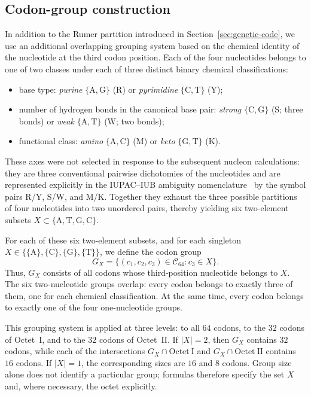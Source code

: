 \documentclass[11pt,a4paper]{article}
\renewcommand{\_}{\origunderscore\allowbreak}
\begin{document}
\subsection{Codon-group construction}
\label{sec:partitioning}

In addition to the Rumer partition introduced in
Section~\ref{sec:genetic-code}, we use an additional overlapping
grouping system based on the chemical identity of the nucleotide at
the third codon position. Each of the four nucleotides belongs to
one of two classes under each of three distinct binary chemical
classifications:
\begin{itemize}
  \item base type: \emph{purine}
        $\{\mathrm{A},\mathrm{G}\}$ (R) or \emph{pyrimidine}
        $\{\mathrm{C},\mathrm{T}\}$ (Y);
  \item number of hydrogen bonds in the canonical base pair:
        \emph{strong} $\{\mathrm{C},\mathrm{G}\}$ (S; three bonds)
        or \emph{weak} $\{\mathrm{A},\mathrm{T}\}$ (W; two bonds);
  \item functional class: \emph{amino}
        $\{\mathrm{A},\mathrm{C}\}$ (M) or \emph{keto}
        $\{\mathrm{G},\mathrm{T}\}$ (K).
\end{itemize}
These axes were not selected in response to the subsequent
nucleon calculations: they are three conventional pairwise
dichotomies of the nucleotides and are represented explicitly
in the IUPAC--IUB ambiguity nomenclature~\cite{cornishbowden1985} by the symbol pairs
R/Y, S/W, and M/K. Together they exhaust the three
possible partitions of four nucleotides into two unordered
pairs, thereby yielding six two-element subsets
$X \subset \{\mathrm{A}, \mathrm{T}, \mathrm{G}, \mathrm{C}\}$.

For each of these six two-element subsets, and for each singleton
$X\in\{\{\mathrm{A}\},\{\mathrm{C}\},\{\mathrm{G}\},
\{\mathrm{T}\}\}$, we define the codon group
\[
G_X =
\{(c_1,c_2,c_3)\in\mathcal{C}_{64}
  : c_3\in X\}.
\]
Thus, $G_X$ consists of all codons whose third-position nucleotide
belongs to $X$. The six two-nucleotide groups overlap: every codon
belongs to exactly three of them, one for each chemical
classification. At the same time, every codon belongs to exactly
one of the four one-nucleotide groups.

This grouping system is applied at three levels: to all $64$
codons, to the $32$ codons of Octet~I, and to the $32$ codons of
Octet~II. If $|X|=2$, then $G_X$ contains $32$ codons, while each
of the intersections $G_X\cap\mathrm{Octet~I}$ and
$G_X\cap\mathrm{Octet~II}$ contains $16$ codons. If $|X|=1$, the
corresponding sizes are $16$ and $8$ codons. Group size alone does
not identify a particular group; formulas therefore specify the
set $X$ and, where necessary, the octet explicitly.
\end{document}
